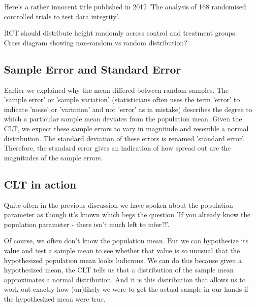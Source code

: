 \documentclass[a4paper,twosided,notoc]{tufte-book}
\begin{document}
Here's a rather innocent title published in 2012 'The analysis of 168 randomised controlled trials to test data integrity'. 

RCT should distribute height randomly across control and treatment groups. Crass diagram showing non-random vs random distribution?

\subsection{Sample Error and Standard Error}

Earlier we explained why the mean differed between random samples. The 'sample error' or 'sample variation' (statisticians often uses the term 'error' to indicate 'noise' or 'variation' and not 'error' as in mistake) describes the degree to which a particular sample mean deviates from the population mean. Given the CLT, we expect these sample errors to vary in magnitude and resemble a normal distribution. The standard deviation of these errors is renamed 'standard error'. Therefore, the standard error gives an indication of how spread out are the magnitudes of the sample errors.

\subsection{CLT in action}
Quite often in the previous discussion we have spoken about the population parameter as though it's known which begs the question 'If you already know the population parameter - there isn't much left to infer?!'. 

Of course, we often don't know the population mean. But we can hypothesize its value and test a sample mean to see whether that value is so unusual that the hypothesized population mean looks ludicrous. We can do this because given a hypothesized mean, the CLT tells us that a distribution of the sample mean approximates a normal distribution. And it is this distribution that allows us to work out exactly how (un)likely we were to get the actual sample in our hands if the hypothesized mean were true. 
\end{document}
